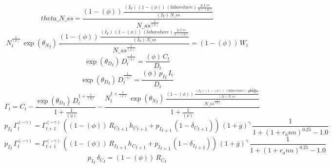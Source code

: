 \begin{dmath*}
theta\_N\_ss = \frac{\left(1-{(\phi)}\right)\, \frac{{(I_Y)}\, \left(1-{(\phi)}\right)\, {(labor share)}\, \frac{{p\_I\_ss}}{1-{(\phi)}}}{{(I_Y)}\, {N\_ss}}}{{N\_ss}^{\frac{1}{{(\nu)}}}}
\end{dmath*}
\begin{dmath}
{{N}}_{t}^{\frac{1}{{(\nu)}}}\, \exp\left({{\theta_N}}_{t}\right)\, \frac{\left(1-{(\phi)}\right)\, \frac{{(I_Y)}\, \left(1-{(\phi)}\right)\, {(labor share)}\, \frac{{p\_I\_ss}}{1-{(\phi)}}}{{(I_Y)}\, {N\_ss}}}{{N\_ss}^{\frac{1}{{(\nu)}}}}=\left(1-{(\phi)}\right)\, {{W}}_{t}
\end{dmath}
\begin{dmath}
\exp\left({{\theta_D}}_{t}\right)\, {{D}}_{t}^{\frac{1}{{(\eta)}}}=\frac{{(\phi)}\, {{C}}_{t}}{{{D}}_{t}}
\end{dmath}
\begin{dmath}
\exp\left({{\theta_D}}_{t}\right)\, {{D}}_{t}^{\frac{1}{{(\eta)}}}=\frac{{(\phi)}\, {{p_I}}_{t}\, {{I}}_{t}}{{{D}}_{t}}
\end{dmath}
\begin{dmath}
{{\Gamma}}_{t}={{C}}_{t}-\frac{\exp\left({{\theta_D}}_{t}\right)\, {{D}}_{t}^{1+\frac{1}{{(\eta)}}}}{1+\frac{1}{{(\eta)}}}-\frac{{{N}}_{t}^{1+\frac{1}{{(\nu)}}}\, \exp\left({{\theta_N}}_{t}\right)\, \frac{\left(1-{(\phi)}\right)\, \frac{{(I_Y)}\, \left(1-{(\phi)}\right)\, {(labor share)}\, \frac{{p\_I\_ss}}{1-{(\phi)}}}{{(I_Y)}\, {N\_ss}}}{{N\_ss}^{\frac{1}{{(\nu)}}}}}{1+\frac{1}{{(\nu)}}}
\end{dmath}
\begin{dmath}
{{p_I}}_{t}\, {{\Gamma}}_{t}^{\left(-{{\gamma}}\right)}={{\Gamma}}_{t+1}^{\left(-{{\gamma}}\right)}\, \left(\left(1-{(\phi)}\right)\, {{R_C}}_{t+1}\, {{h_C}}_{t+1}+{{p_I}}_{t+1}\, \left(1-{{\delta_C}}_{t+1}\right)\right)\, \left(1+{{\overline{g}}}\right)^{{{\gamma}}}\, \frac{1}{1+\left(1+{{r_ann}}\right)^{0.25}-1.0}
\end{dmath}
\begin{dmath}
{{p_I}}_{t}\, {{\Gamma}}_{t}^{\left(-{{\gamma}}\right)}={{\Gamma}}_{t+1}^{\left(-{{\gamma}}\right)}\, \left(\left(1-{(\phi)}\right)\, {{R_I}}_{t+1}\, {{h_C}}_{t+1}+{{p_I}}_{t+1}\, \left(1-{{\delta_I}}_{t+1}\right)\right)\, \left(1+{{\overline{g}}}\right)^{{{\gamma}}}\, \frac{1}{1+\left(1+{{r_ann}}\right)^{0.25}-1.0}
\end{dmath}
\begin{dmath}
{{p_I}}_{t}\, {{\delta_C}}_{t}=\left(1-{(\phi)}\right)\, {{R_C}}_{t}
\end{dmath}

